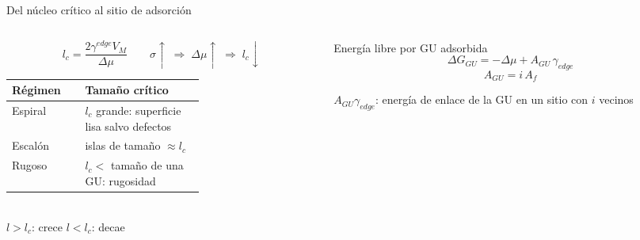 \documentclass[aspectratio=169,11pt]{beamer}
\begin{document}
\begin{frame}{Del núcleo crítico al sitio de adsorción}
  \begin{columns}[T,onlytextwidth]
    \begin{column}{0.52\textwidth}
      \[
        l_c = \frac{2\gamma^{edge} V_M}{\Delta\mu}
        \qquad \sigma\uparrow \;\Rightarrow\; \Delta\mu\uparrow \;\Rightarrow\; l_c\downarrow
      \]
      \vspace{0.2em}
      \renewcommand{\arraystretch}{1.3}
      \small
      \begin{tabular}{@{}l>{\raggedright\arraybackslash}p{0.62\linewidth}@{}}
        \toprule
        Régimen & Tamaño crítico \\
        \midrule
        Espiral & $l_c$ grande: superficie lisa salvo defectos \\
        Escalón & islas de tamaño $\approx l_c$ \\
        Rugoso  & $l_c <$ tamaño de una GU: rugosidad \\
        \bottomrule
      \end{tabular}\\[0.5em]
      {\footnotesize $l>l_c$: crece \quad $l<l_c$: decae}
    \end{column}
    \begin{column}{0.45\textwidth}
      \begin{block}{Energía libre por GU adsorbida}
        \begin{equation}
          \Delta G_{GU} = -\Delta\mu + A_{GU}\,\gamma_{edge} \tag{5}
        \end{equation}
        \[
          A_{GU} = i\,A_f
        \]
      \end{block}
      \vspace{0.4em}
      {\small $A_{GU}\gamma_{edge}$: energía de enlace de la GU en un sitio con $i$ vecinos}
    \end{column}
  \end{columns}
\end{frame}
\end{document}
